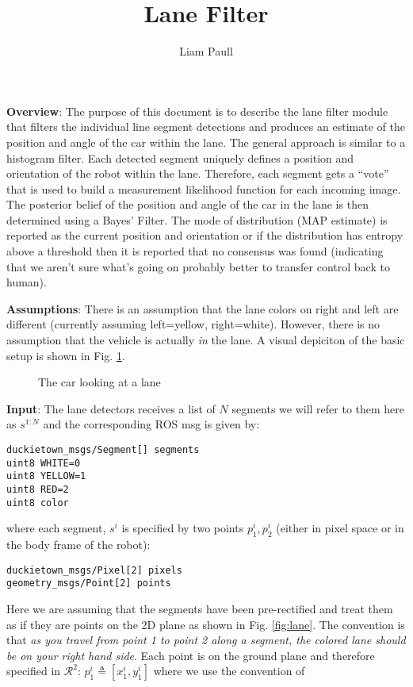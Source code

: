 \documentclass[12pt]{article}
\title{Lane Filter}
\author{Liam Paull}
\date{}
\begin{document}
\maketitle

{\bf Overview}: The purpose of this document is to describe the lane filter module that filters the individual line segment detections and produces an estimate of the position and angle of the car within the lane. The general approach is similar to a histogram filter. Each detected segment uniquely defines a position and orientation of the robot within the lane. Therefore, each segment gets a ``vote'' that is used to build a measurement likelihood function for each incoming image. The posterior belief of the position and angle of the car in the lane is then determined using a Bayes' Filter. The mode of distribution (MAP estimate) is reported as the current position and orientation or if the distribution has entropy above a threshold then it is reported that no consensus was found (indicating that we aren't sure what's going on probably better to transfer control back to human). 

\vspace{0.5cm}
{\bf Assumptions}: There is an assumption that the lane colors on right and left are different (currently assuming left=yellow, right=white). However, there is no assumption that the vehicle is actually \textit{in} the lane. A visual depiciton of the basic setup is shown in Fig. \ref{fig:car_on_road}.

\begin{figure}[htb]
\centering
\def\svgwidth{10cm}

\caption{The car looking at a lane}
\label{fig:car_on_road}
\end{figure}


\vspace{0.5cm}
{\bf Input}: The lane detectors receives a list of $N$ segments we will refer to them here as $s^{1:N}$ and the corresponding ROS msg is given by:
\begin{verbatim}
duckietown_msgs/Segment[] segments                                                       
uint8 WHITE=0
uint8 YELLOW=1
uint8 RED=2
uint8 color
\end{verbatim}
where each segment, $s^i$ is specified by two points $p^i_1,p^i_2$ (either in pixel space or in the body frame of the robot):
\begin{verbatim}
duckietown_msgs/Pixel[2] pixels                                                          
geometry_msgs/Point[2] points 
\end{verbatim}
Here we are assuming that the segments have been pre-rectified and treat them as if they are points on the 2D plane as shown in Fig. \ref{fig:lane}. The convention is that \textit{as you travel from point 1 to point 2 along a segment, the colored lane should be on your right hand side}. Each point is on the ground plane and therefore specified in $\mathcal{R}^2$: $p^i_1 \triangleq [x^i_1,y^i_1]$ where we use the convention of 
\end{document}
